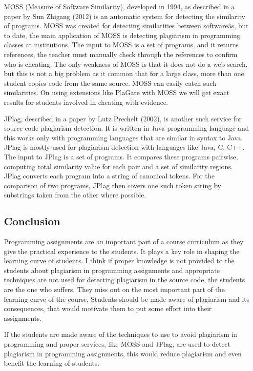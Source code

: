 \documentclass[a4paper]{article}
\begin{document}
MOSS (Measure of Software Similarity), developed in 1994, as described
in a paper by Sun Zhigang (2012) is an automatic system for detecting
the similarity of programs. MOSS was created for detecting similarities
between softwareâs, but to date, the main application of MOSS is
detecting plagiarism in programming classes at institutions. The input
to MOSS is a set of programs, and it returns references, the teacher
must manually check through the references to confirm who is cheating.
The only weakness of MOSS is that it does not do a web search, but this
is not a big problem as it common that for a large class, more than one
student copies code from the same source. MOSS can easily catch such
similarities. On using extensions like PlaGate with MOSS we will get
exact results for students involved in cheating with evidence.

JPlag, described in a paper by Lutz Prechelt (2002), is another such
service for source code plagiarism detection. It is written in Java
programming language and this works only with programming languages that
are similar in syntax to Java. JPlag is mostly used for plagiarism
detection with languages like Java, C, C++. The input to JPlag is a set
of programs. It compares these programs pairwise, computing total
similarity value for each pair and a set of similarity regions. JPlag
converts each program into a string of canonical tokens. For the
comparison of two programs, JPlag then covers one such token string by
substrings taken from the other where possible.

\subsection{Conclusion}\label{conclusion}

Programming assignments are an important part of a course curriculum as
they give the practical experience to the students. It plays a key role
in shaping the learning curve of students. I think if proper knowledge
is not provided to the students about plagiarism in programming
assignments and appropriate techniques are not used for detecting
plagiarism in the source code, the students are the one who suffers.
They miss out on the most important part of the learning curve of the
course. Students should be made aware of plagiarism and its
consequences, that would motivate them to put some effort into their
assignments.

If the students are made aware of the techniques to use to avoid
plagiarism in programming and proper services, like MOSS and JPlag, are
used to detect plagiarism in programming assignments, this would reduce
plagiarism and even benefit the learning of students.
\end{document}
